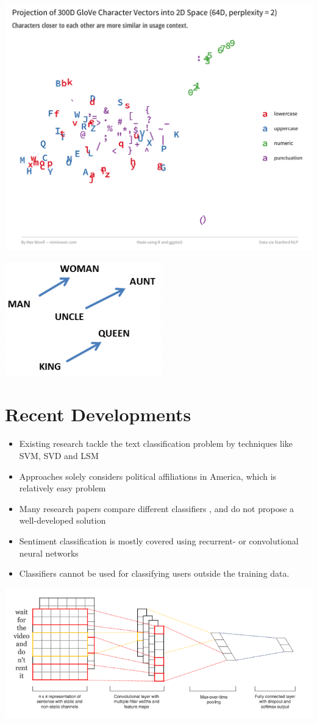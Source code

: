 \documentclass[final]{beamer}
\begin{document}
\begin{frame}[t]
\begin{multicols}{3}
\centering
\includegraphics[width=0.80\linewidth]{char-tsne-2.png}

\centering
\includegraphics[width=0.40\linewidth]{Vecs}

\section{Recent Developments}
\begin{itemize}
  \item Existing research \cite{ref2} tackle the text classification problem by techniques like SVM, SVD and LSM
  \item Approaches solely considers political affiliations in America, which is relatively easy problem
  \item Many research papers compare different classifiers \cite{ref1}, and do not propose a well-developed solution
  \item Sentiment classification is mostly covered using recurrent- or convolutional neural networks \cite{ref4}
  \item Classifiers cannot be used for classifying users outside the training data.\cite{ref3}
\end{itemize}
\centering
\includegraphics[width=0.70\linewidth]{cnn.png}


\end{multicols}
\end{frame}
\end{document}

